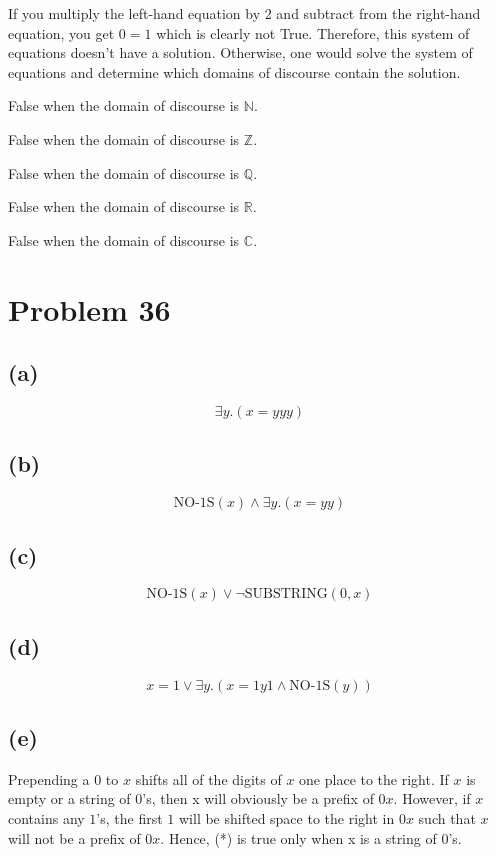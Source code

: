 \documentclass{article}
\begin{document}
If you multiply the left-hand equation by 2 and subtract from the right-hand equation, you get $0 = 1$ which is clearly not True. Therefore, this system of equations doesn't have a solution. Otherwise, one would solve the system of equations and determine which domains of discourse contain the solution.

False when the domain of discourse is $\mathbb{N}$.

False when the domain of discourse is $\mathbb{Z}$.

False when the domain of discourse is $\mathbb{Q}$.

False when the domain of discourse is $\mathbb{R}$.

False when the domain of discourse is $\mathbb{C}$.

\pagebreak

\section{Problem 36}

\subsection{(a)}
\[
	\exists y.(x = yyy)
\]

\subsection{(b)}
\[
	\text{NO-1S}(x) \land  \exists y.(x = yy)
\]

\subsection{(c)}
\[
	\text{NO-1S}(x) \lor \neg \text{SUBSTRING}(0, x)
\]

\subsection{(d)}
\[
	x = 1 \lor \exists y.(x = 1y1 \land \text{NO-1S}(y))
\]

\subsection{(e)}
Prepending a $0$ to $x$ shifts all of the digits of $x$ one place to the right. If $x$ is empty or a string of $0$'s, then x will obviously be a prefix of $0x$. However, if $x$ contains any $1$'s, the first $1$ will be shifted space to the right in $0x$ such that $x$ will not be a prefix of $0x$. Hence, (*) is true only when x is a string of $0$'s.
\end{document}
